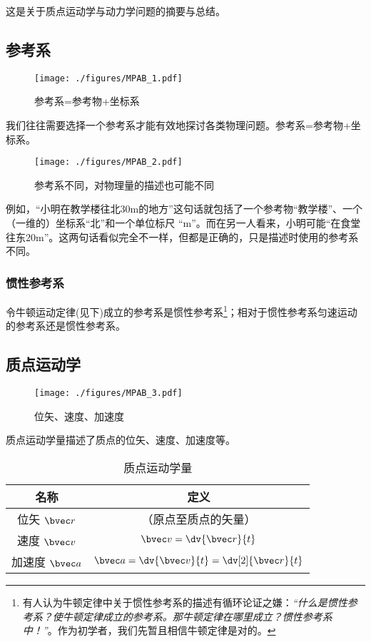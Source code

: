 
\begin{issues}
\issueDraft
\end{issues}

这是关于质点运动学与动力学问题的摘要与总结。

\subsection{参考系}
\begin{figure}[ht]
\centering
\texttt{[image: ./figures/MPAB\_1.pdf]}
\caption{参考系=参考物+坐标系} \label{MPAB_fig1}
\end{figure}
我们往往需要选择一个参考系才能有效地探讨各类物理问题。参考系=参考物+坐标系。

\begin{figure}[ht]
\centering
\texttt{[image: ./figures/MPAB\_2.pdf]}
\caption{参考系不同，对物理量的描述也可能不同} \label{MPAB_fig2}
\end{figure}
例如，“小明在教学楼往北30m的地方”这句话就包括了一个参考物“教学楼”、一个（一维的）坐标系“北”和一个单位标尺 “m”。而在另一人看来，小明可能“在食堂往东20m”。这两句话看似完全不一样，但都是正确的，只是描述时使用的参考系不同。

\subsubsection{惯性参考系}
令牛顿运动定律(见下)成立的参考系是惯性参考系\footnote{有人认为牛顿定律中关于惯性参考系的描述有循环论证之嫌：\textsl{“什么是惯性参考系？使牛顿定律成立的参考系。那牛顿定律在哪里成立？惯性参考系中！”}。作为初学者，我们先暂且相信牛顿定律是对的。}；相对于惯性参考系匀速运动的参考系还是惯性参考系。

\subsection{质点运动学}
\begin{figure}[ht]
\centering
\texttt{[image: ./figures/MPAB\_3.pdf]}
\caption{位矢、速度、加速度} \label{MPAB_fig3}
\end{figure}

质点运动学量描述了质点的位矢、速度、加速度等。
\begin{table}[ht]
\centering
\caption{质点运动学量}\label{MPAB_tab1}
\begin{tabular}{|c|c|}
\hline
名称 & 定义 \\
\hline
位矢 $\bvec r$ & （原点至质点的矢量） \\
\hline
速度 $\bvec v$& $\bvec v = \dv{\bvec r}{t}$ \\
\hline
加速度 $\bvec a$& $\bvec a = \dv{\bvec v}{t} = \dv[2]{\bvec r}{t}$ \\
\hline
\end{tabular}
\end{table}

